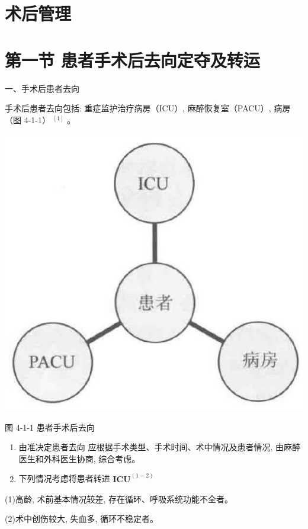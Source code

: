 \documentclass[10pt]{article}
\begin{document}
\section*{术后管理}
\section*{第一节 患者手术后去向定夺及转运}
一、手术后患者去向

手术后患者去向包括: 重症监护治疗病房（ICU）, 麻醉恢复室（PACU）, 病房（图 4-1-1） ${ }^{[1]}$ 。

\begin{center}
\includegraphics[max width=\textwidth]{2024_07_05_645bb794a4d4f32ee0c8g-261(1)}
\end{center}

图 4-1-1 患者手术后去向

\begin{enumerate}
  \item 由准决定患者去向 应根据手术类型、手术时间、术中情况及患者情况, 由麻醉医生和外科医生协商, 综合考虑。

  \item 下列情况考虑将患者转进 $\mathbf{I C U}^{(1-2)}$

\end{enumerate}

(1)高龄, 术前基本情况较差, 存在循环、呼吸系统功能不全者。

(2)术中创伤较大, 失血多, 循环不稳定者。
\end{document}

